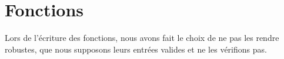 \documentclass[a4paper, 12pt]{article}
\begin{document}
    \section{Fonctions}
    Lors de l'écriture des fonctions, nous avons fait le choix de ne pas les rendre robustes, \cad que nous supposons leurs entrées valides et ne les vérifions pas.
    
    
    
    
    
\end{document}
